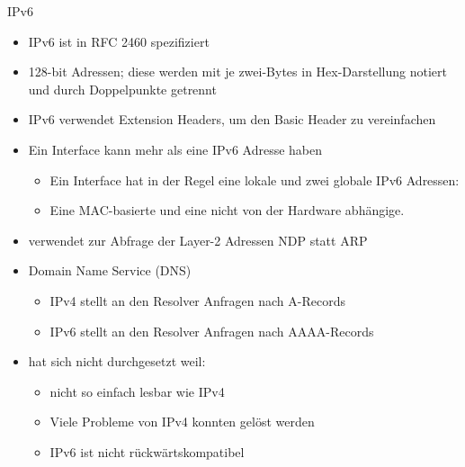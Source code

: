 \begin{definition}{IPv6}
    \begin{itemize}
        \item IPv6 ist in RFC 2460 spezifiziert
        \item 128-bit Adressen; diese werden mit je zwei-Bytes in Hex-Darstellung notiert und durch Doppelpunkte getrennt
        \item IPv6 verwendet Extension Headers, um den Basic Header zu vereinfachen
        \item Ein Interface kann mehr als eine IPv6 Adresse haben
        \begin{itemize}
            \item Ein Interface hat in der Regel eine lokale und zwei globale IPv6 Adressen:
            \item Eine MAC-basierte und eine nicht von der Hardware abhängige.
        \end{itemize}
        \item verwendet zur Abfrage der Layer-2 Adressen NDP statt ARP
        \item Domain Name Service (DNS)
        \begin{itemize}
            \item IPv4 stellt an den Resolver Anfragen nach A-Records
            \item IPv6 stellt an den Resolver Anfragen nach AAAA-Records
        \end{itemize}
        \item hat sich nicht durchgesetzt weil:
        \begin{itemize}
            \item nicht so einfach lesbar wie IPv4
            \item Viele Probleme von IPv4 konnten gelöst werden
            \item IPv6 ist nicht rückwärtskompatibel
        \end{itemize}
    \end{itemize}
    
\end{definition}

